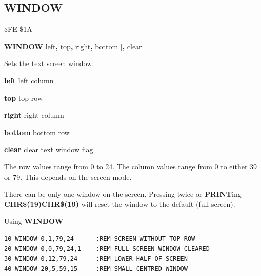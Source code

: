 \subsection{WINDOW}
\begin{description}[leftmargin=2cm,style=nextline]
\item [Token:] \$FE \$1A
\item [Format:] {\bf WINDOW} left{\bf,} top{\bf,} right{\bf,} bottom
		[{\bf,} clear]
\item [Usage:] Sets the text screen window.

                 {\bf left} left column

                 {\bf top} top row

                 {\bf right} right column

                 {\bf bottom} bottom row

                 {\bf clear} clear text window flag

\item [Remarks:] The row values range from 0 to 24.
                 The column values range from 0 to either 39 or 79.
                 This depends on the screen mode.

                 There can be only one window on the screen.
                 Pressing  twice or {\bf PRINT}ing
                 {\bf CHR\$(19)CHR\$(19)} will reset the window
                 to the default (full screen).

\item [Example:] Using {\bf WINDOW}
\begin{tcolorbox}[colback=black,coltext=white]
\verbatimfont{\codefont}
\begin{verbatim}
10 WINDOW 0,1,79,24      :REM SCREEN WITHOUT TOP ROW
20 WINDOW 0,0,79,24,1    :REM FULL SCREEN WINDOW CLEARED
30 WINDOW 0,12,79,24     :REM LOWER HALF OF SCREEN
40 WINDOW 20,5,59,15     :REM SMALL CENTRED WINDOW
\end{verbatim}
\end{tcolorbox}
\end{description}


\newpage
